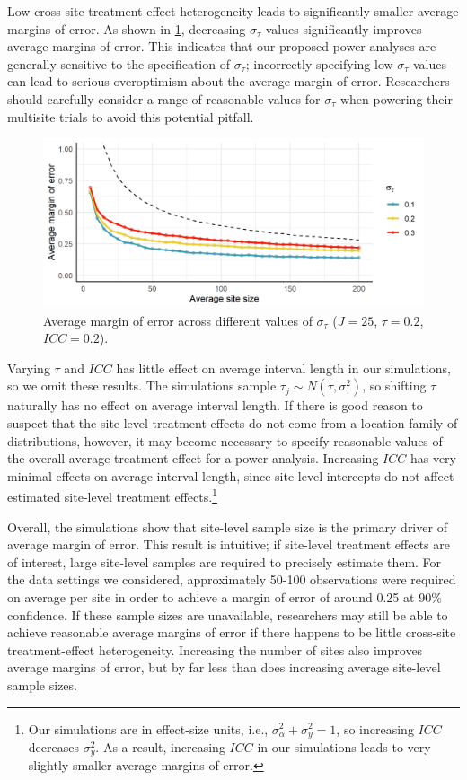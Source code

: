 \documentclass[]{article}
\begin{document}
Low cross-site treatment-effect heterogeneity leads to significantly smaller average margins of error.
As shown in \ref{fig:results_txsd}, decreasing $\sigma_\tau$ values significantly improves average margins of error.
This indicates that our proposed power analyses are generally sensitive to the specification of $\sigma_\tau$;
incorrectly specifying low $\sigma_\tau$ values can lead to serious overoptimism about the average margin of error.
Researchers should carefully consider a range of reasonable values for $\sigma_\tau$ when powering their multisite trials to avoid this potential pitfall.
\begin{figure}[ht]
	\centering
	\includegraphics[width=\textwidth]{simstudy_txsd_length}
	\caption{Average margin of error across different values of $\sigma_\tau$ ($J=25$, $\tau=0.2$, $ICC=0.2$).}
	\label{fig:results_txsd}
\end{figure}

Varying $\tau$ and $ICC$ has little effect on average interval length in our simulations, so we omit these results.
The simulations sample $\tau_j \sim N(\tau, \sigma_\tau^2)$, so shifting $\tau$ naturally has no effect on average interval length.
If there is good reason to suspect that the site-level treatment effects do not come from a location family of distributions, however, it may become necessary to specify reasonable values of the overall average treatment effect for a power analysis.
Increasing $ICC$ has very minimal effects on average interval length, since site-level intercepts do not affect estimated site-level treatment effects.\footnote{Our simulations are in effect-size units, i.e., $\sigma^2_\alpha + \sigma^2_y = 1$, so increasing $ICC$ decreases $\sigma^2_y$.
As a result, increasing $ICC$ in our simulations leads to very slightly smaller average margins of error.}

Overall, the simulations show that site-level sample size is the primary driver of average margin of error.
This result is intuitive; if site-level treatment effects are of interest, large site-level samples are required to precisely estimate them.
For the data settings we considered, approximately 50-100 observations were required on average per site in order to achieve a margin of error of around 0.25 at 90\% confidence.
If these sample sizes are unavailable, researchers may still be able to achieve reasonable average margins of error if there happens to be little cross-site treatment-effect heterogeneity.
Increasing the number of sites also improves average margins of error, but by far less than does increasing average site-level sample sizes.
\end{document}
